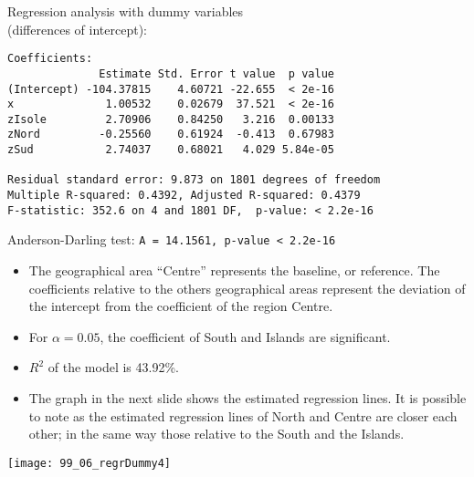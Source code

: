 \begin{frame}[fragile]
  Regression analysis with dummy variables\\ (differences of intercept):\\
  \begin{small}
    \begin{verbatim}
Coefficients:
              Estimate Std. Error t value  p value    
(Intercept) -104.37815    4.60721 -22.655  < 2e-16
x              1.00532    0.02679  37.521  < 2e-16
zIsole         2.70906    0.84250   3.216  0.00133 
zNord         -0.25560    0.61924  -0.413  0.67983    
zSud           2.74037    0.68021   4.029 5.84e-05

Residual standard error: 9.873 on 1801 degrees of freedom
Multiple R-squared: 0.4392,	Adjusted R-squared: 0.4379 
F-statistic: 352.6 on 4 and 1801 DF,  p-value: < 2.2e-16 
    \end{verbatim}
  \vspace{-0.5cm}
  Anderson-Darling test: \verb+A = 14.1561, p-value < 2.2e-16+
  \end{small}
\end{frame}

\begin{frame}
  \vspace{0.5cm}
  \begin{itemize}
    \item The geographical area ``Centre'' represents the baseline, or reference. The coefficients relative to the others geographical areas represent the deviation of the intercept from the coefficient of the region Centre.
    \vspace{0.25cm}
    \item For $ \alpha = 0.05 $, the coefficient of South and Islands are significant.
    \vspace{0.25cm}
    \item $R^2$ of the model is 43.92\%.
    \vspace{0.25cm}
    \item The graph in the next slide shows the estimated regression lines. It is possible to note as the estimated regression lines of North and Centre are closer each other; in the same way those relative to the South and the Islands.
  \end{itemize}
\end{frame}

\begin{frame}
  \vspace{-0.3cm}
  \begin{center}
    \texttt{[image: 99\_06\_regrDummy4]}
  \end{center}
\end{frame}

